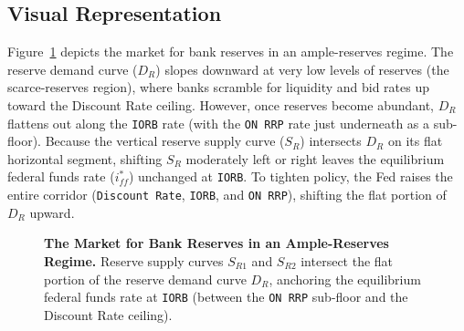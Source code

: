 \documentclass[11pt, a4paper]{article}
\begin{document}
\subsection*{Visual Representation}
Figure~\ref{fig:ample_reserves} depicts the market for bank reserves in an ample-reserves regime. The reserve demand curve ($D_R$) slopes downward at very low levels of reserves (the scarce-reserves region), where banks scramble for liquidity and bid rates up toward the Discount Rate ceiling. However, once reserves become abundant, $D_R$ flattens out along the \texttt{IORB} rate (with the \texttt{ON RRP} rate just underneath as a sub-floor). Because the vertical reserve supply curve ($S_R$) intersects $D_R$ on its flat horizontal segment, shifting $S_R$ moderately left or right leaves the equilibrium federal funds rate ($i_{ff}^*$) unchanged at \texttt{IORB}. To tighten policy, the Fed raises the entire corridor (\texttt{Discount Rate}, \texttt{IORB}, and \texttt{ON RRP}), shifting the flat portion of $D_R$ upward.

\begin{figure}[htbp]
\centering
{}
\caption{\textbf{The Market for Bank Reserves in an Ample-Reserves Regime.} Reserve supply curves $S_{R1}$ and $S_{R2}$ intersect the flat portion of the reserve demand curve $D_R$, anchoring the equilibrium federal funds rate at \texttt{IORB} (between the \texttt{ON RRP} sub-floor and the Discount Rate ceiling).}
\label{fig:ample_reserves}
\end{figure}
\end{document}
